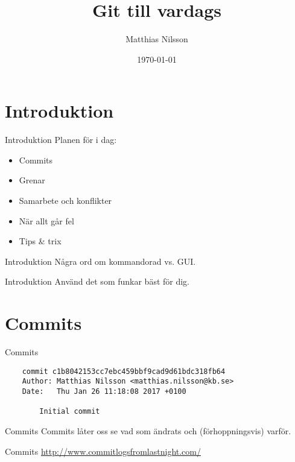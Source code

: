 \documentclass[11pt,xetex]{beamer}
\title{Git till vardags}
\date{\today}
\author{Matthias Nilsson}
\begin{document}
\maketitle


\section*{Introduktion}

\begin{frame}{Introduktion}
  \Large
  Planen för i dag:

  \begin{itemize}
    \item Commits
    \item Grenar
    \item Samarbete och konflikter
    \item När allt går fel
    \item Tips \& trix
  \end{itemize}
\end{frame}

\begin{frame}{Introduktion}
  \Large
  Några ord om kommandorad vs. GUI.
\end{frame}

\begin{frame}{Introduktion}
  \Large
  Använd det som funkar bäst för dig.
\end{frame}

\section*{Commits}

\begin{frame}[fragile]{Commits}
  \begin{verbatim}
    commit c1b8042153cc7ebc459bbf9cad9d61bdc318fb64
    Author: Matthias Nilsson <matthias.nilsson@kb.se>
    Date:   Thu Jan 26 11:18:08 2017 +0100

        Initial commit
  \end{verbatim}
\end{frame}

\begin{frame}{Commits}
  \Large
  Commits låter oss se vad som ändrats och (förhoppningsvis) varför.
\end{frame}

\begin{frame}{Commits}
  \Large
  \url{http://www.commitlogsfromlastnight.com/}
\end{frame}
\end{document}
